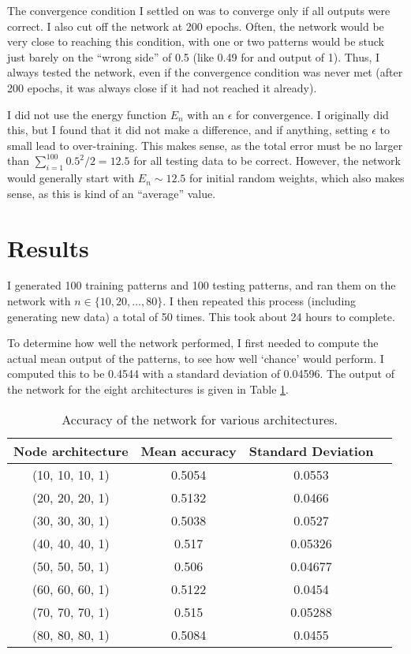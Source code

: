\documentclass[12pt]{article}
\begin{document}
The convergence condition I settled on was to converge only if all outputs were correct.  I also cut off the network at 200 epochs.  Often, the network would be very close to reaching this condition, with one or two patterns would be stuck just barely on the ``wrong side'' of 0.5 (like 0.49 for and output of 1).  Thus, I always tested the network, even if the convergence condition was never met (after 200 epochs, it was always close if it had not reached it already).

I did not use the energy function $E_n$ with an $\epsilon$ for convergence.  I originally did this, but I found that it did not make a difference, and if anything, setting $\epsilon$ to small lead to over-training.  This makes sense, as the total error must be no larger than $\sum_{i=1}^{100}{0.5^2}/2=12.5$ for all testing data to be correct.  However, the network would generally start with $E_n \sim 12.5$ for initial random weights, which also makes sense, as this is kind of an ``average'' value.

\section{Results}
I generated 100 training patterns and 100 testing patterns, and ran them on the network with $n\in\{10, 20, \ldots, 80\}$.  I then repeated this process (including generating new data) a total of 50 times. This took about 24 hours to complete.

To determine how well the network performed, I first needed to compute the actual mean output of the patterns, to see how well `chance' would perform.  I computed this to be 0.4544 with a standard deviation of 0.04596.  The output of the network for the eight architectures is given in Table \ref{Accuracy-Table}.

\begin{table}[h]
    \begin{center}
    \begin{tabular}{|c|c|c|c|}
        \hline
        Node architecture & Mean accuracy & Standard Deviation \\
        \hline
        (10, 10, 10, 1) & 0.5054 &  0.0553\\
        \hline
        (20, 20, 20, 1) & 0.5132 &  0.0466\\
        \hline
        (30, 30, 30, 1) & 0.5038 &  0.0527\\
        \hline
        (40, 40, 40, 1) & 0.517  & 0.05326\\
        \hline
        (50, 50, 50, 1) & 0.506  & 0.04677\\
        \hline
        (60, 60, 60, 1) & 0.5122 &  0.0454\\
        \hline
        (70, 70, 70, 1) & 0.515  & 0.05288\\
        \hline
        (80, 80, 80, 1) & 0.5084 &  0.0455\\
        \hline
    \end{tabular}
    \end{center}
    \caption{Accuracy of the network for various architectures.}
    \label{Accuracy-Table}
\end{table}
\end{document}
